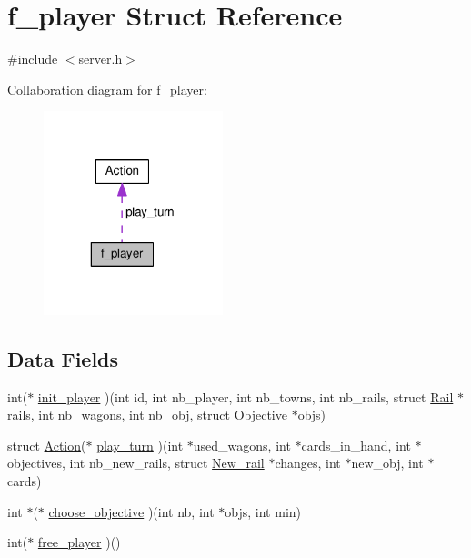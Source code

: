 \hypertarget{structf__player}{\section{f\-\_\-player Struct Reference}
\label{structf__player}
}


{\ttfamily \#include $<$server.\-h$>$}



Collaboration diagram for f\-\_\-player\-:
\nopagebreak
\begin{figure}[H]
\begin{center}
\leavevmode
\includegraphics[width=148pt]{structf__player__coll__graph}
\end{center}
\end{figure}
\subsection*{Data Fields}
\begin{DoxyCompactItemize}
\item 
int($\ast$ \hyperlink{structf__player_ae803883f2825f7d13bbf12ad4c9b92ac}{init\-\_\-player} )(int id, int nb\-\_\-player, int nb\-\_\-towns, int nb\-\_\-rails, struct \hyperlink{structRail}{Rail} $\ast$rails, int nb\-\_\-wagons, int nb\-\_\-obj, struct \hyperlink{structObjective}{Objective} $\ast$objs)
\item 
struct \hyperlink{structAction}{Action}($\ast$ \hyperlink{structf__player_acbc97ea5cbb0c80c1a3ce98fea12c52e}{play\-\_\-turn} )(int $\ast$used\-\_\-wagons, int $\ast$cards\-\_\-in\-\_\-hand, int $\ast$objectives, int nb\-\_\-new\-\_\-rails, struct \hyperlink{structNew__rail}{New\-\_\-rail} $\ast$changes, int $\ast$new\-\_\-obj, int $\ast$cards)
\item 
int $\ast$($\ast$ \hyperlink{structf__player_a30b2a1a6dc61d60d60112b63199f72f6}{choose\-\_\-objective} )(int nb, int $\ast$objs, int min)
\item 
int($\ast$ \hyperlink{structf__player_ae47872a4531e4c79eb94348179812809}{free\-\_\-player} )()
\end{DoxyCompactItemize}


